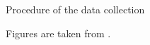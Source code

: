 \documentclass[ucs,9pt,usenames,dvipsnames]{beamer}
\begin{document}
\begin{frame}{Procedure of the data collection}
\begin{minipage}[c]{0.49\linewidth}
	
\end{minipage}
\centering
\tiny
Figures are taken from \cite{b1}.
\end{frame}
\end{document}
